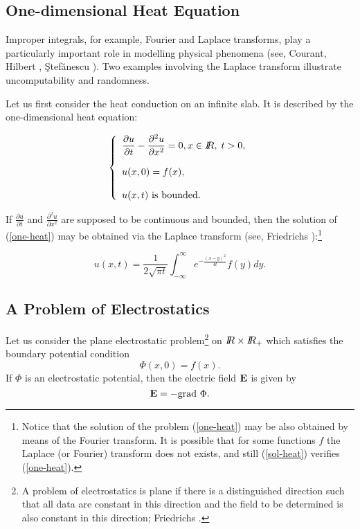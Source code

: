 \subsection{One-dimensional Heat Equation}

Improper integrals, for example,
Fourier and Laplace transforms, play a particularly important role
in modelling physical phenomena (see, Courant,  Hilbert
\cite{ch}, \c{S}tef\u anescu \cite{ds}).
Two examples involving the Laplace transform  illustrate
uncomputability and randomness.


Let us first consider the heat conduction on an infinite slab. It is described
by the one-dimensional heat equation:

        \begin{equation}\label{one-heat}
                \left\{\begin{array}{lc}
\displaystyle\frac{\partial u}{\partial t} -
\frac{\partial^2 u}{\partial x^2} = 0,  x\in \RR, \; t>0, \\
%
\\
u(x,0) = f(x), \\
%
\\
u(x,t) \mbox{ \rm is bounded.}
                \end{array}\right.
        \end{equation}

If $\displaystyle\frac{\partial u}{\partial t}$ and
$\displaystyle\frac{\partial^2 u}{\partial x^2}$ are supposed to be continuous
and bounded, then the solution of  (\ref{one-heat}) may be obtained
via the Laplace transform (see, Friedrichs \cite{kof}):\footnote{Notice that
the solution of the problem (\ref{one-heat}) may be also obtained by means
of the Fourier transform.
It is possible that for some functions $f$ the Laplace (or Fourier)
transform does not exists, and still  (\ref{sol-heat})
verifies  (\ref{one-heat}). }

        \begin{equation}\label{sol-heat}
u(x,t) = \displaystyle\frac{1}{2\sqrt{\pi t}}\int_{-\infty}^{\infty}
e^{-\frac{(x-y)^2}{4t}}f(y)dy.
        \end{equation}


        \subsection{A Problem of Electrostatics}


Let us consider the plane electrostatic problem\footnote{A problem of
electrostatics is plane if there is a distinguished
direction such that all data are constant in this direction and the field
to be determined is also constant in this direction;  Friedrichs
\cite{kof}.}
 on $I\!\!R\times I\!\!R_+$ which
satisfies the boundary potential condition
        \[ \Phi (x,0) = f(x). \]
If $\Phi$ is an electrostatic potential, then the electric field
${\bf E}$ is given by
        \[{\bf E} = - \mbox{\rm grad  } \Phi .\]

